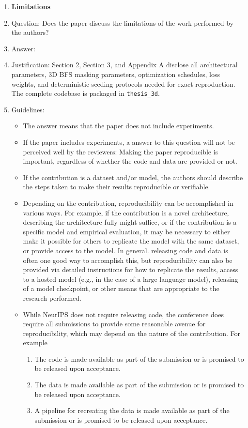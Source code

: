 \begin{enumerate}
\item {\bf Limitations}
    \item[] Question: Does the paper discuss the limitations of the work performed by the authors?
    \item[] Answer: \answerYes{}
    \item[] Justification: Section 2, Section 3, and Appendix A disclose all architectural parameters, 3D BFS masking parameters, optimization schedules, loss weights, and deterministic seeding protocols needed for exact reproduction. The complete codebase is packaged in \texttt{thesis\_3d}.
    \item[] Guidelines:
    \begin{itemize}
        \item The answer \answerNA{} means that the paper does not include experiments.
        \item If the paper includes experiments, a \answerNo{} answer to this question will not be perceived well by the reviewers: Making the paper reproducible is important, regardless of whether the code and data are provided or not.
        \item If the contribution is a dataset and\slash or model, the authors should describe the steps taken to make their results reproducible or verifiable. 
        \item Depending on the contribution, reproducibility can be accomplished in various ways. For example, if the contribution is a novel architecture, describing the architecture fully might suffice, or if the contribution is a specific model and empirical evaluation, it may be necessary to either make it possible for others to replicate the model with the same dataset, or provide access to the model. In general. releasing code and data is often one good way to accomplish this, but reproducibility can also be provided via detailed instructions for how to replicate the results, access to a hosted model (e.g., in the case of a large language model), releasing of a model checkpoint, or other means that are appropriate to the research performed.
        \item While NeurIPS does not require releasing code, the conference does require all submissions to provide some reasonable avenue for reproducibility, which may depend on the nature of the contribution. For example
        \begin{enumerate}
            \item The code is made available as part of the submission or is promised to be released upon acceptance.
            \item The data is made available as part of the submission or is promised to be released upon acceptance.
            \item A pipeline for recreating the data is made available as part of the submission or is promised to be released upon acceptance.
        \end{enumerate}
    \end{itemize}


\end{enumerate}
